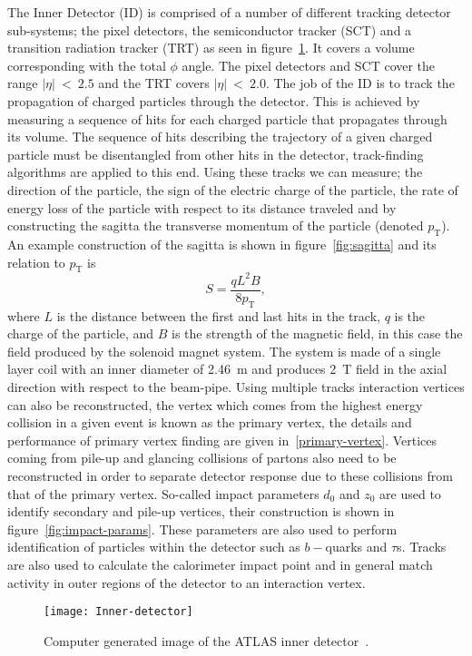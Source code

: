 The Inner Detector (ID) is comprised of a number of different tracking detector
sub-systems; the pixel detectors, the semiconductor tracker (SCT) and a
transition radiation tracker (TRT) as seen in figure~\ref{fig:ATLAS-inner-det}.
It covers a volume corresponding with the total $\phi$ angle. The pixel
detectors and SCT cover the range $|\eta|~<~2.5$ and the TRT covers
$|\eta|~<~2.0$. The job of the ID is to track the propagation of charged
particles through the detector. This is achieved by measuring a sequence of hits
for each charged particle that propagates through its volume. The sequence of
hits describing the trajectory of a given charged particle must be disentangled
from other hits in the detector, track-finding algorithms are applied to this
end. Using these tracks we can measure; the direction of the particle, the sign
of the electric charge of the particle, the rate of energy loss of the particle
with respect to its distance traveled and by constructing the sagitta the
transverse momentum of the particle (denoted $p_{\mathrm{T}}$). An example
construction of the sagitta is shown in figure~\ref{fig:sagitta} and its
relation to $p_{\mathrm{T}}$ is
\begin{equation}
  \label{eq:sagitta} S = \frac{qL^{2}B}{8p_{\mathrm{T}}},
\end{equation} where $L$ is the distance between the first and last hits in the
track, $q$ is the charge of the particle, and $B$ is the strength of the
magnetic field, in this case the field produced by the solenoid magnet system.
 The system is made of a single layer coil with an
inner diameter of 2.46~m and produces 2~T field in the axial direction with
respect to the beam-pipe. Using multiple tracks interaction vertices can also be
reconstructed, the vertex which comes from the highest energy collision in a
given event is known as the primary vertex, the details and performance of
primary vertex finding are given in~\ref{primary-vertex}. Vertices coming from
pile-up and glancing collisions of partons also need to be reconstructed in
order to separate detector response due to these collisions from that of the
primary vertex.  So-called impact parameters
$d_0$ and $z_0$ are used to identify secondary and pile-up vertices, their
construction is shown in figure~\ref{fig:impact-params}. These parameters are
also used to perform identification of particles within the detector such as
$b-$quarks and $\tau$s. Tracks are also used to calculate the calorimeter impact
point and in general match activity in outer regions of the detector to an
interaction vertex.
\begin{figure}[ht] \centering
\texttt{[image: Inner-detector]}
  \caption[ATLAS inner detector]{Computer generated image of the ATLAS inner
detector~\cite{ATLAS-inner-det}.}%
  \label{fig:ATLAS-inner-det}
\end{figure}

